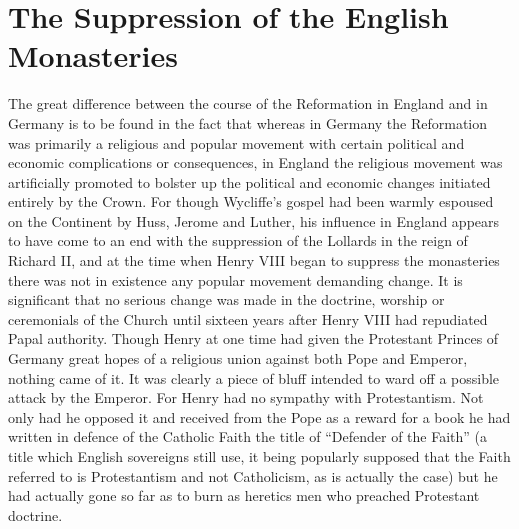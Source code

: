 \documentclass{book}
\begin{document}
\chapter{The Suppression of the English Monasteries}
\label{chapter-11}
The great difference between the course of the Reformation in England and in Germany is to be found in the fact that whereas in Germany the Reformation was primarily a religious and popular movement with certain political and economic complications or consequences, in England the religious movement was artificially promoted to bolster up the political and economic changes initiated entirely by the Crown. For though Wycliffe’s gospel had been warmly espoused on the Continent by Huss, Jerome and Luther, his influence in England appears to have come to an end with the suppression of the Lollards in the reign of Richard II, and at the time when Henry VIII began to suppress the monasteries there was not in existence any popular movement demanding change. It is significant that no serious change was made in the doctrine, worship or ceremonials of the Church until sixteen years after Henry VIII had repudiated Papal authority. Though Henry at one time had given the Protestant Princes of Germany great hopes of a religious union against both Pope and Emperor, nothing came of it. It was clearly a piece of bluff intended to ward off a possible attack by the Emperor. For Henry had no sympathy with Protestantism. Not only had he opposed it and received from the Pope as a reward for a book he had written in defence of the Catholic Faith the title of “Defender of the Faith” (a title which English sovereigns still use, it being popularly supposed that the Faith referred to is Protestantism and not Catholicism, as is actually the case) but he had actually gone so far as to burn as heretics men who preached Protestant doctrine.
\end{document}
